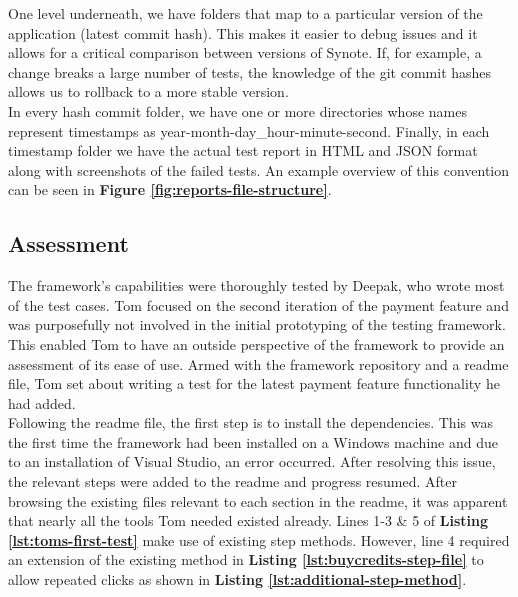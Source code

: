 One level underneath, we have folders that map to a particular version of the application (latest commit hash). This makes it easier to debug issues and it allows for a critical comparison between versions of Synote. If, for example, a change breaks a large number of tests, the knowledge of the git commit hashes allows us to rollback to a more stable version.
\\

In every hash commit folder, we have one or more directories whose names represent timestamps as year-month-day\_hour-minute-second. Finally, in each timestamp folder we have the actual test report in HTML and JSON format along with screenshots of the failed tests. An example overview of this convention can be seen in \textbf{Figure \ref{fig:reports-file-structure}}.
\\

\label{fig:reports-file-structure}

\subsection{Assessment}
\label{subsec:assessment}

The framework's capabilities were thoroughly tested by Deepak, who wrote most of the test cases. Tom focused on the second iteration of the payment feature and was purposefully not involved in the initial prototyping of the testing framework. This enabled Tom to have an outside perspective of the framework to provide an assessment of its ease of use. Armed with the framework repository and a readme file, Tom set about writing a test for the latest payment feature functionality he had added.\\

Following the readme file, the first step is to install the dependencies. This was the first time the framework had been installed on a Windows machine and due to an installation of Visual Studio, an error occurred. After resolving this issue, the relevant steps were added to the readme and progress resumed. After browsing the existing files relevant to each section in the readme, it was apparent that nearly all the tools Tom needed existed already. Lines 1-3 \& 5 of \textbf{Listing \ref{lst:toms-first-test}} make use of existing step methods. However, line 4 required an extension of the existing method in \textbf{Listing \ref{lst:buycredits-step-file}} to allow repeated clicks as shown in \textbf{Listing \ref{lst:additional-step-method}}.\\

